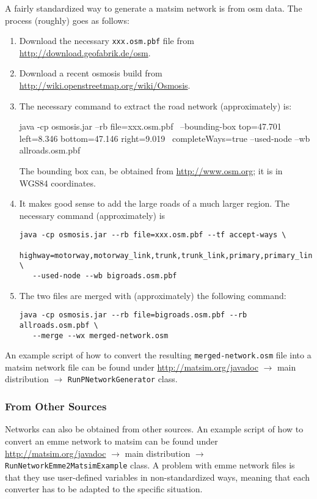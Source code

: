 A fairly standardized way to generate a \gls{matsim} network is from \gls{osm} data.  The process (roughly) goes as follows:
\begin{enumerate}

\item Download the necessary \lstinline{xxx.osm.pbf} file from \url{http://download.geofabrik.de/osm}.

\item Download a recent \gls{osmosis} build from \url{http://wiki.openstreetmap.org/wiki/Osmosis}.

\item The necessary command to extract the road network (approximately) is:
\begin{shell}
java -cp osmosis.jar --rb file=xxx.osm.pbf \
   --bounding-box top=47.701 left=8.346 bottom=47.146 right=9.019 \
   completeWays=true --used-node --wb allroads.osm.pbf
\end{shell}
The bounding box can, \eg be obtained from \url{http://www.osm.org}; it is in WGS84 coordinates.

\item It makes good sense to add the large roads of a much larger region.  The necessary command (approximately) is
\begin{lstlisting}
java -cp osmosis.jar --rb file=xxx.osm.pbf --tf accept-ways \
   highway=motorway,motorway_link,trunk,trunk_link,primary,primary_link \ 
   --used-node --wb bigroads.osm.pbf
\end{lstlisting}

\item The two files are merged with (approximately) the following command:
\begin{lstlisting}
java -cp osmosis.jar --rb file=bigroads.osm.pbf --rb allroads.osm.pbf \
   --merge --wx merged-network.osm
\end{lstlisting}

\end{enumerate}
An example script of how to convert the resulting \lstinline{merged-network.osm} file into a \gls{matsim} network file can be found under \url{http://matsim.org/javadoc} $\to$ main distribution $\to$ \lstinline{RunPNetworkGenerator} class.

\subsubsection{From Other Sources}

Networks can also be obtained from other sources.  An example script of how to convert an \gls{emme} network to \gls{matsim} can be found under \url{http://matsim.org/javadoc} $\to$ main distribution $\to$ \lstinline{RunNetworkEmme2MatsimExample} class.  A problem with \gls{emme} network files is that they use user-defined variables in non-standardized ways, meaning that each converter has to be adapted to the specific situation.

